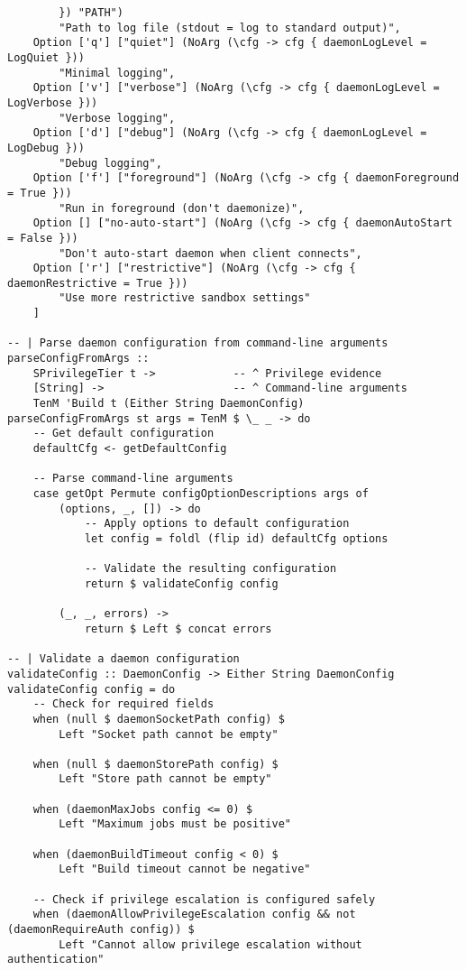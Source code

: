 \documentclass{article}
\begin{document}
\begin{tcolorbox}[title=Ten/Daemon/Config.hs Changes]
\begin{verbatim}
        }) "PATH")
        "Path to log file (stdout = log to standard output)",
    Option ['q'] ["quiet"] (NoArg (\cfg -> cfg { daemonLogLevel = LogQuiet }))
        "Minimal logging",
    Option ['v'] ["verbose"] (NoArg (\cfg -> cfg { daemonLogLevel = LogVerbose }))
        "Verbose logging",
    Option ['d'] ["debug"] (NoArg (\cfg -> cfg { daemonLogLevel = LogDebug }))
        "Debug logging",
    Option ['f'] ["foreground"] (NoArg (\cfg -> cfg { daemonForeground = True }))
        "Run in foreground (don't daemonize)",
    Option [] ["no-auto-start"] (NoArg (\cfg -> cfg { daemonAutoStart = False }))
        "Don't auto-start daemon when client connects",
    Option ['r'] ["restrictive"] (NoArg (\cfg -> cfg { daemonRestrictive = True }))
        "Use more restrictive sandbox settings"
    ]

-- | Parse daemon configuration from command-line arguments
parseConfigFromArgs ::
    SPrivilegeTier t ->            -- ^ Privilege evidence
    [String] ->                    -- ^ Command-line arguments
    TenM 'Build t (Either String DaemonConfig)
parseConfigFromArgs st args = TenM $ \_ _ -> do
    -- Get default configuration
    defaultCfg <- getDefaultConfig

    -- Parse command-line arguments
    case getOpt Permute configOptionDescriptions args of
        (options, _, []) -> do
            -- Apply options to default configuration
            let config = foldl (flip id) defaultCfg options

            -- Validate the resulting configuration
            return $ validateConfig config

        (_, _, errors) ->
            return $ Left $ concat errors

-- | Validate a daemon configuration
validateConfig :: DaemonConfig -> Either String DaemonConfig
validateConfig config = do
    -- Check for required fields
    when (null $ daemonSocketPath config) $
        Left "Socket path cannot be empty"

    when (null $ daemonStorePath config) $
        Left "Store path cannot be empty"

    when (daemonMaxJobs config <= 0) $
        Left "Maximum jobs must be positive"

    when (daemonBuildTimeout config < 0) $
        Left "Build timeout cannot be negative"

    -- Check if privilege escalation is configured safely
    when (daemonAllowPrivilegeEscalation config && not (daemonRequireAuth config)) $
        Left "Cannot allow privilege escalation without authentication"


\end{verbatim}
\end{tcolorbox}
\end{document}
